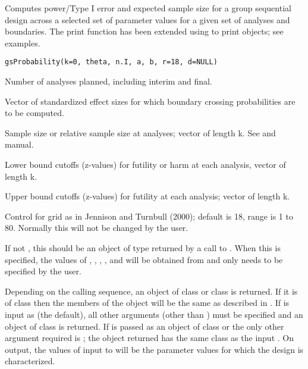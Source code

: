 \begin{Description}\relax
Computes power/Type I error and expected sample size for a group sequential design
across a selected set of parameter values for a given set of analyses and boundaries.
The print function has been extended using  to print  objects; see examples.
\end{Description}
\begin{Usage}
\begin{verbatim}
gsProbability(k=0, theta, n.I, a, b, r=18, d=NULL)
\end{verbatim}
\end{Usage}
\begin{Arguments}
\begin{ldescription}
\item[\code{k}] Number of analyses planned, including interim and final.
\item[\code{theta}] Vector of standardized effect sizes for which boundary crossing probabilities are to be computed.
\item[\code{n.I}] Sample size or relative sample size at analyses; vector of length k. See  and manual.
\item[\code{a}] Lower bound cutoffs (z-values) for futility or harm at each analysis, vector of length k.
\item[\code{b}] Upper bound cutoffs (z-values) for futility at each analysis; vector of length k.
\item[\code{r}] Control for grid as in Jennison and Turnbull (2000); default is 18, range is 1 to 80.
Normally this will not be changed by the user.
\item[\code{d}] If not , this should be an object of type  returned by a call to . 
When this is specified, the values of , , , , and  will be obtained from  and
only  needs to be specified by the user.
\end{ldescription}
\end{Arguments}
\begin{Details}\relax
Depending on the calling sequence, an object of class  or class  is returned.
If it is of class  then the members of the object will be the same as described in .
If  is input as  (the default), all other arguments (other than ) must be specified 
and an object of class  is returned.
If  is passed as an object of class  or  the only other argument required is ;
the object returned has the same class as the input .
On output, the values of  input to  will be the parameter values for which the
design is characterized.
\end{Details}
